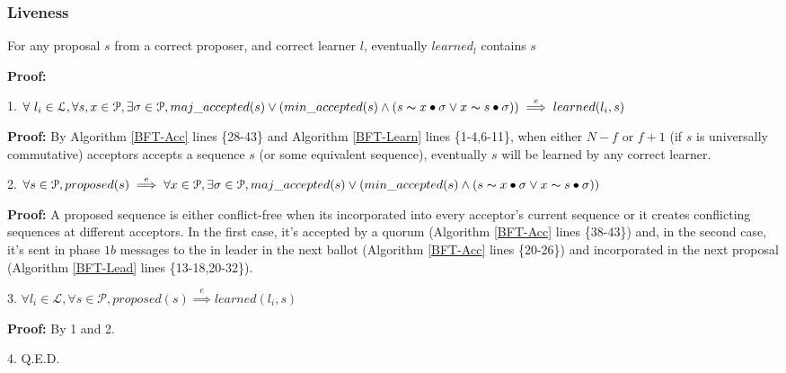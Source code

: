 \subsubsection{Liveness}
\begin{theorem}
For any proposal $s$ from a correct proposer, and correct learner $l$, eventually $learned_l$ contains $s$\par
\end{theorem} 
\parbox{\linewidth}{\textbf{Proof:}} \par
\parbox{\linewidth}{\strut1. $\forall\ l_i \in \mathcal{L},\forall s,x \in \mathcal{P}, \exists \sigma \in \mathcal{P}, maj\_accepted(s) \lor (min\_accepted(s) \land  (s \thicksim x \bullet \sigma \lor x \thicksim s \bullet \sigma))\overset{e}{\implies} learned(l_i,s)$}\par
\indent\indent\parbox{\linewidth}{\strut\textbf{Proof:} By Algorithm \ref{BFT-Acc} lines \{28-43\} and Algorithm \ref{BFT-Learn} lines \{1-4,6-11\}, when either $N-f$ or $f+1$ (if $s$ is universally commutative) acceptors accepts a sequence $s$ (or some equivalent sequence), eventually $s$ will be learned by any correct learner.}\par
\parbox{\linewidth}{\strut2. $\forall s \in \mathcal{P}, proposed(s) \overset{e}{\implies} \forall x \in \mathcal{P}, \exists \sigma \in \mathcal{P}, maj\_accepted(s) \lor (min\_accepted(s) \land  (s \thicksim x \bullet \sigma \lor x \thicksim s \bullet \sigma))$} \par
\indent\indent\parbox{\linewidth}{\strut\textbf{Proof:} A proposed sequence is either conflict-free when its incorporated into every acceptor's current sequence or it creates conflicting sequences at different acceptors. In the first case, it's accepted by a quorum (Algorithm \ref{BFT-Acc} lines \{38-43\}) and, in the second case, it's sent in phase $1b$ messages to the in leader in the next ballot (Algorithm \ref{BFT-Acc} lines \{20-26\}) and incorporated in the next proposal (Algorithm \ref{BFT-Lead} lines \{13-18,20-32\}).} \par
\parbox{\linewidth}{\strut3. $\forall l_i \in \mathcal{L}, \forall s \in \mathcal{P}, proposed(s) \overset{e}{\implies} learned(l_i,s)$} \par
\indent\indent\parbox{\linewidth}{\strut\textbf{Proof:} By 1 and 2.} \par
\parbox{\linewidth}{\strut4. Q.E.D.}